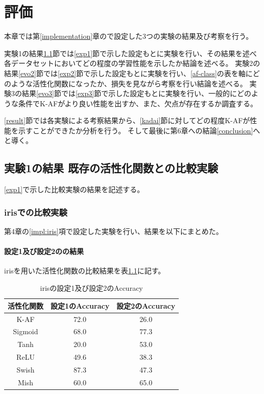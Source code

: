 \chapter{評価}
\label{evaluation}

本章では第\ref{implementation}章ので設定した3つの実験の結果及び考察を行う。

実験1の結果\ref{evo1}節では\ref{exp1}節で示した設定もとに実験を行い、その結果を述べ各データセットにおいてどの程度の学習性能を示したか結論を述べる。
実験2の結果\ref{evo2}節では\ref{exp2}節で示した設定もとに実験を行い、\ref{af-class}の表を軸にどのような活性化関数になったか、損失を見ながら考察を行い結論を述べる。
実験3の結果\ref{evo3}節では\ref{exp3}節で示した設定もとに実験を行い、一般的にどのような条件でK-AFがより良い性能を出すか、また、欠点が存在するか調査する。

\ref{result}節では各実験による考察結果から、\ref{kadai}節に対してどの程度K-AFが性能を示すことができたか分析を行う。
そして最後に第6章への結論\ref{conclusion}へと導く。


\section{実験1の結果 既存の活性化関数との比較実験}
\label{evo1}
\ref{exp1}で示した比較実験の結果を記述する。

\subsection{irisでの比較実験}
\label{ev:iris}

第4章の\ref{impl:iris}項で設定した実験を行い、結果を以下にまとめた。
\subsubsection{設定1及び設定2のの結果}

irisを用いた活性化関数の比較結果を表\ref{result:iristable}に記す。

\begin{table}[htbp]
    \begin{center}
        \caption{irisの設定1及び設定2のAccuracy}
        \label{result:iristable}
        \vspace{2mm} 
        \begin{tabular}{|c|c|c|}
            \hline
            活性化関数  & 設定1のAccuracy &  設定2のAccuracy \\
            \hline
            K-AF            & 72.0 & 26.0 \\
            \hline
            Sigmoid            & 68.0 & 77.3\\
            \hline
            Tanh            & 20.0 & 53.0\\
            \hline
            ReLU        &  49.6 &  38.3\\
            \hline
            Swish           & 87.3 & 47.3 \\
            \hline
            Mish           & 60.0 & 65.0 \\
            \hline
    
        \end{tabular}
    \end{center}
\end{table}


